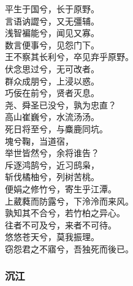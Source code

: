 \documentclass[]{article}
\begin{document}
平生于国兮，长于原野。\\
言语讷譅兮，又无彊辅。\\
浅智褊能兮，闻见又寡。\\
数言便事兮，见怨门下。\\
王不察其长利兮，卒见弃乎原野。\\
伏念思过兮，无可改者。\\
群众成朋兮，上浸以惑。\\
巧佞在前兮，贤者灭息。\\
尧、舜圣已没兮，孰为忠直？\\
高山崔巍兮，水流汤汤。\\
死日将至兮，与麋鹿同坑。\\
塊兮鞠，当道宿，\\
举世皆然兮，余将谁告？\\
斥逐鸿鹄兮，近习鸱枭，\\
斩伐橘柚兮，列树苦桃。\\
便娟之修竹兮，寄生乎江潭。\\
上葳蕤而防露兮，下泠泠而来风。\\
孰知其不合兮，若竹柏之异心。\\
往者不可及兮，来者不可待。\\
悠悠苍天兮，莫我振理。\\
窃怨君之不寤兮，吾独死而後已。

\hypertarget{header-n2991}{%
\subsubsection{沉江}\label{header-n2991}}
\end{document}
